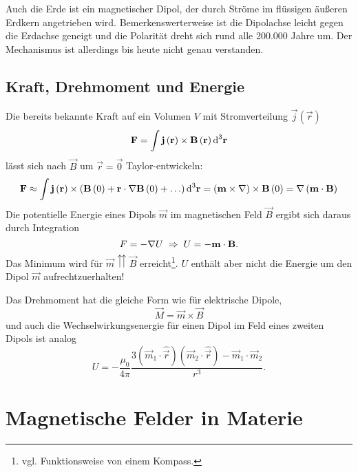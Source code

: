 Auch die Erde ist ein magnetischer Dipol, der durch Ströme im flüssigen äußeren Erdkern angetrieben wird. Bemerkenswerterweise ist die Dipolachse leicht gegen die Erdachse geneigt und die Polarität dreht sich rund alle 200.000 Jahre um. Der Mechanismus ist allerdings bis heute nicht genau verstanden.

\subsection{Kraft, Drehmoment und Energie\label{mark-5.4.2}}

Die bereits bekannte Kraft auf ein Volumen $V$ mit Stromverteilung $\vec {j}\left(\vec {r}\right)$
\begin{equation*}
	\mathbf{F}=\int \mathbf{j}\left(\mathbf{r}\right)\times \mathbf{B}\left(\mathbf{r}\right)\text{d} ^{3}\mathbf{r}
\end{equation*}
lässt sich nach $\vec {B}$ um $\vec {r}=\vec {0}$ Taylor-entwickeln:
\begin{equation*}
	\mathbf{F}\approx \int \mathbf{j}\left(\mathbf{r}\right)\times \left(\mathbf{B}\left(0\right)+\mathbf{r}\cdot \nabla \mathbf{B}\left(0\right)+\ldots \right)\text{d} ^{3}\mathbf{r}=\left(\mathbf{m}\times \nabla \right)\times \mathbf{B}\left(0\right)=\nabla \left(\mathbf{m}\cdot \mathbf{B}\right)
\end{equation*}
Die potentielle Energie eines Dipols $\vec {m}$ im magnetischen Feld $\vec {B}$ ergibt sich daraus durch Integration
\begin{equation*}
	F=-\nabla U\;\Rightarrow\; U=-\mathbf{m}\cdot \mathbf{B}.
\end{equation*}
Das Minimum wird für $\vec {m}\upuparrows \vec {B}$ erreicht\footnote{vgl. Funktionsweise von einem Kompass. }. $U$ enthält aber nicht die Energie um den Dipol $\vec {m}$ aufrechtzuerhalten!

Das Drehmoment hat die gleiche Form wie für elektrische Dipole,
\begin{equation*}
	\vec {M}=\vec {m}\times \vec {B}
\end{equation*}
und auch die Wechselwirkungsenergie für einen Dipol im Feld eines zweiten Dipols ist analog
\begin{equation*}
	U=-\frac{\mu _{0}}{4\pi }\frac{3\left(\vec {m}_{1}\cdot \hat{\vec {r}}\right)\left(\vec {m}_{2}\cdot \hat{\vec {r}}\right)-\vec {m}_{1}\cdot \vec {m}_{2}}{r^{3}}.
\end{equation*}



\section{Magnetische Felder in Materie}

